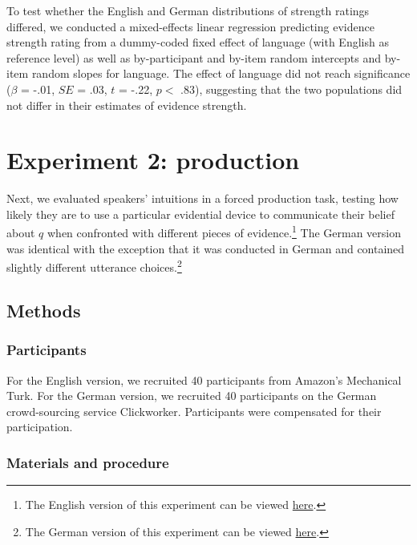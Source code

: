 \documentclass[11pt]{article}
\begin{document}
To test whether the English and German distributions of strength ratings differed, we conducted a mixed-effects linear regression predicting evidence strength rating from a dummy-coded fixed effect of language (with English as reference level) as well as by-participant and by-item random intercepts and by-item random slopes for language. The effect of language did not reach significance ($\beta$ = -.01, $SE$ = .03, $t$ = -.22, $p <$ .83), suggesting that the two populations did not differ in their estimates of evidence strength.   

\section{Experiment 2: production}


Next, we evaluated speakers' intuitions in a forced production task, testing how likely they are to use a particular evidential device to communicate their belief about $q$ when confronted with different pieces of evidence.\footnote{The English version of this experiment can be viewed \href{http://stanford.edu/~jdegen/71_modals_forced_production/modals.html}{here}.} The German version was identical with the exception that it was conducted in German and contained slightly different utterance choices.\footnote{The German version of this experiment can be viewed \href{http://web.stanford.edu/~jdegen/cgi-bin/3_dp_production/modals.html}{here}.}

\subsection{Methods}

\subsubsection{Participants}

For the English version, we recruited 40 participants from Amazon's Mechanical Turk. For the German version, we recruited 40 participants on the German crowd-sourcing service Clickworker. Participants were compensated for their participation.

\subsubsection{Materials and procedure}
\end{document}
